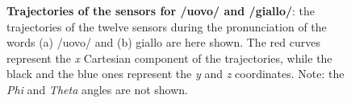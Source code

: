 \begin{figure}
  \centering
	\hspace{0.05\textwidth}

	\caption[Trajectories of the sensors for /uovo/ and /giallo/]{\textbf{Trajectories
	of the sensors for /uovo/ and /giallo/}: the trajectories of the twelve
	sensors during the pronunciation of the words  (a) /uovo/ and
	(b) giallo are here shown.
	The red curves represent the \emph{x} Cartesian component of the
	trajectories, while the black and the blue ones represent the \emph{y} and 
	\emph{z} coordinates.
	Note: the \emph{Phi} and \emph{Theta} angles are not shown.}
	\label{fig:results:trajectories}
\end{figure}
